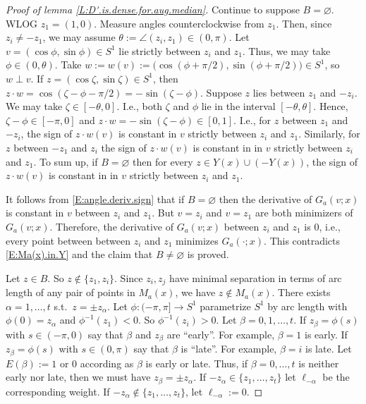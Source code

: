 \documentclass[10pt,a4paper]{amsart}
\begin{document}
\begin{proof}[Proof of lemma \ref{L:D'.is.dense.for.aug.median}]
Continue to suppose $B = \varnothing$. WLOG $z_{1} = (1,0)$. Measure angles counterclockwise from $z_{1}$. Then, since $z_{i} \neq - z_{1}$, we may assume 
$\theta := \angle(z_{i}, z_{1}) \in (0, \pi)$. Let $v = (\cos \phi, \sin \phi) \in S^{1}$ lie strictly between $z_{i}$ and $z_{1}$. Thus, we may take $\phi \in (0, \theta)$. 
Take $w := w(v) := \bigl( \cos (\phi+\pi/2), \sin (\phi+\pi/2) \bigr) \in S^{1}$, 
so $w \perp v$. 
If $z = (\cos \zeta, \sin \zeta)  \in S^{1}$, then 
$z \cdot w = \cos (\zeta - \phi - \pi/2) = -\sin(\zeta - \phi)$. Suppose $z$ lies between $z_{1}$ and $-z_{i}$. We may take $\zeta \in [-\theta, 0]$. I.e., both $\zeta$ and $\phi$ lie in the interval $[-\theta, \theta]$. Hence, $\zeta - \phi \in [-\pi, 0]$ and 
$z \cdot w = -\sin(\zeta - \phi) \in [0,1]$. I.e., for $z$ between $z_{1}$ and $-z_{i}$, the sign of $z \cdot w(v)$ is constant in $v$ strictly between $z_{i}$ and $z_{1}$. 
Similarly, for $z$ between $-z_{1}$ and $z_{i}$ the sign of $z \cdot w(v)$ is constant in  in $v$ strictly between $z_{i}$ and $z_{1}$. To sum up, if $B = \varnothing$ then for every $z \in Y(x) \cup (-Y(x))$, the sign of $z \cdot w(v)$ is constant in  in $v$ strictly between $z_{i}$ and $z_{1}$. 

It follows from \eqref{E:angle.deriv.sign} that if $B = \varnothing$ then the derivative 
of $G_{a}(v; x)$ is constant in $v$ between $z_{i}$ and $z_{1}$. But $v=z_{i}$ and $v=z_{1}$ are both minimizers of $G_{a}(v; x)$. Therefore, the derivative of $G_{a}(v; x)$ between $z_{i}$ and $z_{1}$ is 0, i.e., every point between between $z_{i}$ and $z_{1}$ minimizes $G_{a}(\cdot; x)$. This contradicts \eqref{E:Ma(x).in.Y} and the claim that $B \neq \varnothing$ is proved. 
 
Let $z \in B$. So $z \notin \{ z_{1}, z_{i} \}$. Since $z_{i}, z_{j}$ have minimal separation in terms of arc length of any pair of points in $M_{a}(x)$, we have 
$z \notin M_{a}(x)$. There exists $\alpha = 1, \ldots, t$ s.t.\ $z = \pm z_{\alpha}$.  
Let $\phi : (-\pi, \pi] \to S^{1}$ parametrize $S^{1}$ by arc length 
with $\phi(0) = z_{\alpha}$ and $\phi^{-1}(z_{1}) < 0$. So $\phi^{-1}(z_{i}) > 0$. 
Let $\beta = 0, 1, \ldots, t$. If $z_{\beta} = \phi(s)$ with $s \in (-\pi, 0)$ say that $\beta$ and $z_{\beta}$ are ``early''. For example, $\beta = 1$ is early. If $z_{\beta} = \phi(s)$ with $s \in (0,\pi)$ say that $\beta$ is ``late''. For example, $\beta = i$ is late. Let $E(\beta) := 1$ or 0 according as $\beta$ is early or late. 
Thus, if $\beta = 0, \ldots, t$ is neither early nor late, then we must have $z_{\beta} = \pm z_{\alpha}$. If $-z_{\alpha} \in \{ z_{1}, \ldots, z_{t} \}$ 
let $\ell_{-\alpha}$ be the corresponding weight. 
If $-z_{\alpha} \notin \{ z_{1}, \ldots, z_{t} \}$, let $\ell_{-\alpha} := 0$. 
  

\end{proof}
\end{document}
